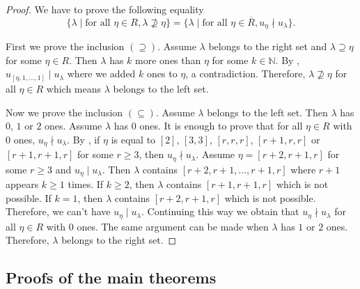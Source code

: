 \documentclass[a4paper, 12pt, reqno]{amsart}
\theoremstyle{remark}
\numberwithin{equation}{subsection}
\begin{document}
\begin{proof}
  We have to prove the following equality
  \begin{equation*}
    \{\lambda \mid \text{for all }\eta \in R, \lambda \nsupseteq \eta\} = \{\lambda \mid \text{for all } \eta \in \overline{R}, u_\eta \nmid u_\lambda\}.
  \end{equation*}
  
  First we prove the inclusion $(\supseteq)$.
  Assume $\lambda$ belongs to the right set and $\lambda \supseteq \eta$ for some $\eta \in R$.
  Then $\lambda$ has $k$ more ones than $\eta$ for some $k \in \mathbb{N}$.
  By , $u_{[\eta, 1, \dots, 1]} \mid u_\lambda$ where we added $k$ ones to $\eta$, a contradiction.
  Therefore, $\lambda \nsupseteq \eta$ for all $\eta \in R$ which means $\lambda$ belongs to the left set.

  Now we prove the inclusion $(\subseteq)$.
  Assume $\lambda$ belongs to the left set.
  Then $\lambda$ has $0$, $1$ or $2$ ones.
  Assume $\lambda$ has $0$ ones.
  It is enough to prove that for all $\eta \in R$ with $0$ ones, $u_\eta \nmid u_\lambda$.
  By , if $\eta$ is equal to $[2]$, $[3, 3]$, $[r, r, r]$, $[r + 1, r, r]$ or $[r + 1, r + 1, r]$ for some $r \ge 3$, then $u_\eta \nmid u_\lambda$.
  Assume $\eta = [r + 2, r + 1, r]$ for some $r \ge 3$ and $u_\eta \mid u_\lambda$.
  Then $\lambda$ contains $[r + 2, r + 1, \dots, r + 1, r]$ where $r + 1$ appears $k \ge 1$ times.
  If $k \ge 2$, then $\lambda$ contains $[r + 1, r + 1, r]$ which is not possible.
  If $k = 1$, then $\lambda$ contains $[r + 2, r + 1, r]$ which is not possible.
  Therefore, we can't have $u_\eta \mid u_\lambda$.
  Continuing this way we obtain that $u_\eta \nmid u_\lambda$ for all $\eta \in R$ with $0$ ones.
  The same argument can be made when $\lambda$ has $1$ or $2$ ones.
  Therefore, $\lambda$ belongs to the right set.
\end{proof}

\subsection{Proofs of the main theorems}
\label{sec:proofs-main-theorems}
\end{document}
